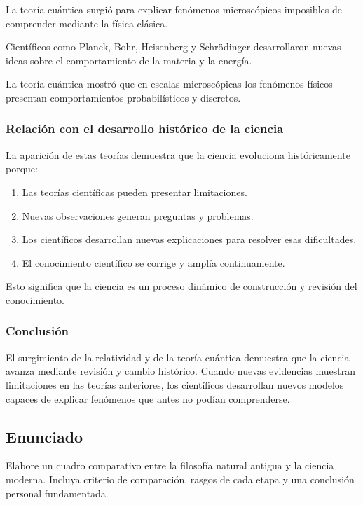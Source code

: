 \documentclass[12pt, a4paper]{article}
\begin{document}
La teoría cuántica surgió para explicar fenómenos microscópicos imposibles de comprender mediante la física clásica.

Científicos como Planck, Bohr, Heisenberg y Schrödinger desarrollaron nuevas ideas sobre el comportamiento de la materia y la energía.

La teoría cuántica mostró que en escalas microscópicas los fenómenos físicos presentan comportamientos probabilísticos y discretos.

\subsubsection*{Relación con el desarrollo histórico de la ciencia}

La aparición de estas teorías demuestra que la ciencia evoluciona históricamente porque:

\begin{enumerate}[label=\arabic*.]

\item Las teorías científicas pueden presentar limitaciones.

\item Nuevas observaciones generan preguntas y problemas.

\item Los científicos desarrollan nuevas explicaciones para resolver esas dificultades.

\item El conocimiento científico se corrige y amplía continuamente.

\end{enumerate}

Esto significa que la ciencia es un proceso dinámico de construcción y revisión del conocimiento.

\subsubsection*{Conclusión}

El surgimiento de la relatividad y de la teoría cuántica demuestra que la ciencia avanza mediante revisión y cambio histórico. Cuando nuevas evidencias muestran limitaciones en las teorías anteriores, los científicos desarrollan nuevos modelos capaces de explicar fenómenos que antes no podían comprenderse.

\newpage

\subsection*{Enunciado}
Elabore un cuadro comparativo entre la filosofía natural antigua y la ciencia moderna. Incluya criterio de comparación, rasgos de cada etapa y una conclusión personal fundamentada.
\end{document}
